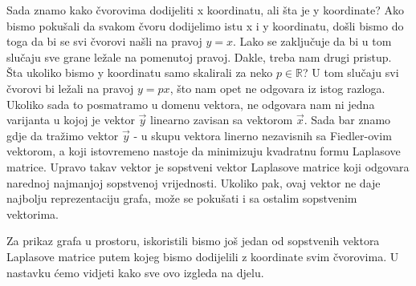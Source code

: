 \documentclass[11pt]{article}
\begin{document}
	Sada znamo kako čvorovima dodijeliti x koordinatu, ali šta je y koordinate? 
	Ako bismo pokušali da svakom čvoru dodijelimo istu x i y koordinatu, došli bismo do toga da bi se svi čvorovi našli na pravoj $y = x$.
	Lako se zaključuje da bi u tom slučaju sve grane ležale na pomenutoj pravoj. Dakle, treba nam drugi pristup. 
    Šta ukoliko bismo y koordinatu samo skalirali za neko $p \in \mathbb{R}$? U tom slučaju svi čvorovi bi ležali na pravoj $y=px$, što nam opet ne odgovara iz istog razloga.
    Ukoliko sada to posmatramo u domenu vektora, ne odgovara nam ni jedna varijanta u kojoj je vektor $\vec{y}$ linearno zavisan sa vektorom $\vec{x}$.
    Sada bar znamo gdje da tražimo vektor $\vec{y}$ - u skupu vektora linerno nezavisnih sa Fiedler-ovim vektorom, a koji istovremeno nastoje da minimizuju kvadratnu formu Laplasove matrice.
    Upravo takav vektor je sopstveni vektor Laplasove matrice koji odgovara narednoj najmanjoj sopstvenoj vrijednosti. 
	Ukoliko pak, ovaj vektor ne daje najbolju reprezentaciju grafa, može se pokušati i sa ostalim sopstvenim vektorima.

    Za prikaz grafa u prostoru, iskoristili bismo još jedan od sopstvenih vektora Laplasove matrice putem kojeg bismo dodijelili z koordinate svim čvorovima.
    U nastavku ćemo vidjeti kako sve ovo izgleda na djelu.
\end{document}
